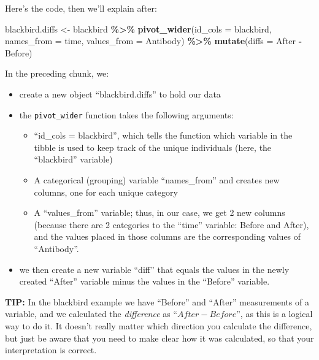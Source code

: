 \documentclass[
]{book}
\newenvironment{Shaded}{\begin{snugshade}}{\end{snugshade}}
\newcommand{\AttributeTok}[1]{\textcolor[rgb]{0.13,0.29,0.53}{#1}}
\newcommand{\FunctionTok}[1]{\textcolor[rgb]{0.13,0.29,0.53}{\textbf{#1}}}
\newcommand{\NormalTok}[1]{#1}
\newcommand{\OtherTok}[1]{\textcolor[rgb]{0.56,0.35,0.01}{#1}}
\newcommand{\SpecialCharTok}[1]{\textcolor[rgb]{0.81,0.36,0.00}{\textbf{#1}}}
\providecommand{\tightlist}{%
  \setlength{\itemsep}{0pt}\setlength{\parskip}{0pt}}
\begin{document}
Here's the code, then we'll explain after:

\begin{Shaded}
\begin{Highlighting}[]
\NormalTok{blackbird.diffs }\OtherTok{\textless{}{-}}\NormalTok{ blackbird }\SpecialCharTok{\%\textgreater{}\%}
  \FunctionTok{pivot\_wider}\NormalTok{(}\AttributeTok{id\_cols =}\NormalTok{ blackbird, }\AttributeTok{names\_from =}\NormalTok{ time, }\AttributeTok{values\_from =}\NormalTok{ Antibody) }\SpecialCharTok{\%\textgreater{}\%}
  \FunctionTok{mutate}\NormalTok{(}\AttributeTok{diffs =}\NormalTok{ After }\SpecialCharTok{{-}}\NormalTok{ Before)}
\end{Highlighting}
\end{Shaded}

In the preceding chunk, we:

\begin{itemize}
\tightlist
\item
  create a new object ``blackbird.diffs'' to hold our data
\item
  the \texttt{pivot\_wider} function takes the following arguments:

  \begin{itemize}
  \tightlist
  \item
    ``id\_cols = blackbird'', which tells the function which variable in the tibble is used to keep track of the unique individuals (here, the ``blackbird'' variable)
  \item
    A categorical (grouping) variable ``names\_from'' and creates new columns, one for each unique category
  \item
    A ``values\_from'' variable; thus, in our case, we get 2 new columns (because there are 2 categories to the ``time'' variable: Before and After), and the values placed in those columns are the corresponding values of ``Antibody''.
  \end{itemize}
\item
  we then create a new variable ``diff'' that equals the values in the newly created ``After'' variable minus the values in the ``Before'' variable.
\end{itemize}

\textbf{TIP:}
In the blackbird example we have ``Before'' and ``After'' measurements of a variable, and we calculated the \emph{difference} as ``\(After - Before\)'', as this is a logical way to do it. It doesn't really matter which direction you calculate the difference, but just be aware that you need to make clear how it was calculated, so that your interpretation is correct.
\end{document}
